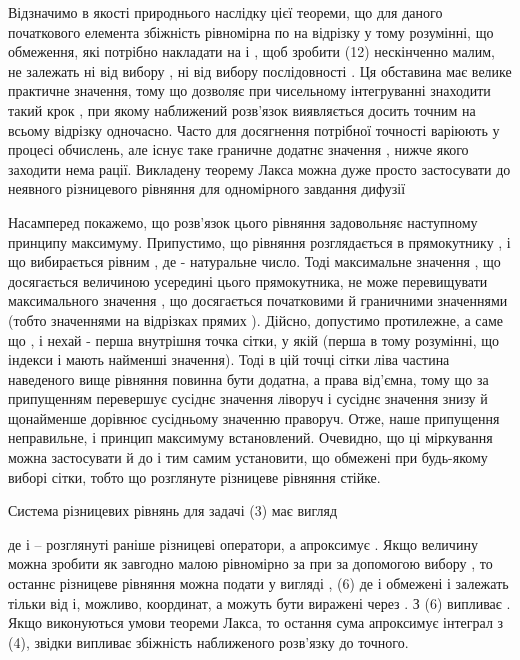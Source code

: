 Відзначимо в якості природнього наслідку цієї теореми, що для даного початкового елемента   збіжність рівномірна по    на відрізку   у тому розумінні, що обмеження, які потрібно накладати на   і  , щоб зробити (12) нескінченно малим, не залежать ні від вибору   , ні від вибору послідовності  . Ця обставина має велике практичне значення, тому що дозволяє при чисельному інтегруванні знаходити такий крок  , при якому наближений розв'язок виявляється досить точним на всьому відрізку   одночасно. Часто для досягнення потрібної точності   варіюють у процесі обчислень, але існує таке граничне додатнє значення  , нижче якого заходити нема рації.
Викладену теорему Лакса можна дуже просто застосувати до неявного різницевого рівняння для одномірного завдання дифузії

 
Насамперед  покажемо, що розв'язок цього рівняння задовольняє наступному принципу максимуму. Припустимо, що рівняння розглядається в прямокутнику  ,  і що   вибирається рівним   , де    - натуральне число. Тоді максимальне значення  , що досягається величиною    усередині цього прямокутника, не може перевищувати максимального значення  , що досягається початковими й граничними значеннями (тобто  значеннями на відрізках прямих  ). Дійсно, допустимо протилежне, а саме що  , і нехай  - перша внутрішня точка сітки, у якій   (перша в тому розумінні, що індекси    і   мають найменші значення). Тоді в цій точці сітки ліва частина наведеного вище рівняння повинна бути додатна, а права від'ємна, тому що   за припущенням перевершує сусіднє значення   ліворуч і сусіднє значення   знизу й щонайменше   дорівнює сусідньому значенню   праворуч. Отже, наше припущення неправильне, і принцип максимуму встановлений. Очевидно, що ці міркування можна застосувати й до    і тим самим установити, що   обмежені при будь-якому виборі сітки, тобто що розглянуте різницеве рівняння стійке.


Система різницевих рівнянь для задачі (3) має вигляд
 
де   і   – розглянуті раніше різницеві оператори,  а   апроксимує  . Якщо величину   можна зробити як завгодно малою рівномірно за   при   за допомогою вибору  , то останнє різницеве рівняння можна подати у вигляді
     ,  (6)
де   і   обмежені і залежать тільки від   і, можливо, координат, а   можуть бути виражені через  . 
    З (6) випливає  . Якщо виконуються умови теореми Лакса, то остання сума апроксимує інтеграл з (4), звідки випливає збіжність наближеного розв'язку до точного.
